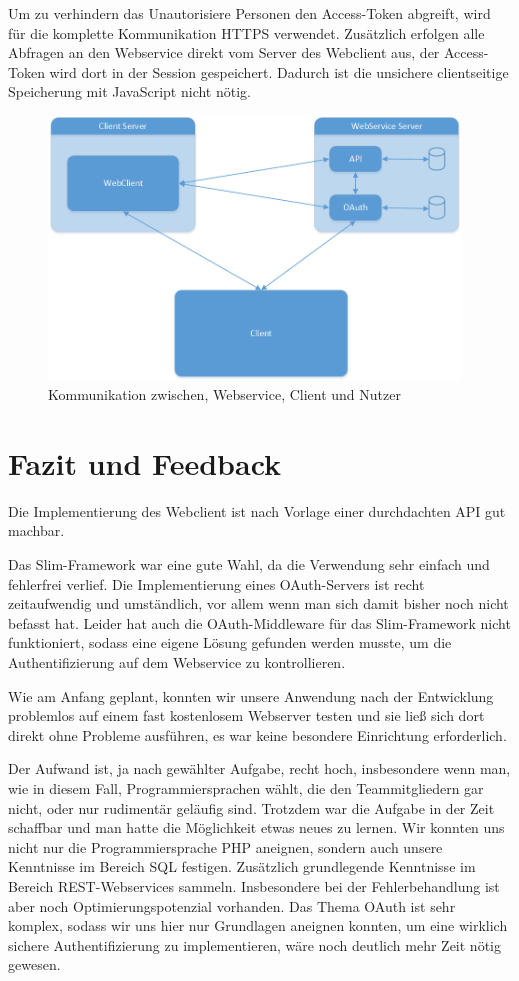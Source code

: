 Um zu verhindern das Unautorisiere Personen den Access-Token abgreift, wird für die komplette Kommunikation HTTPS verwendet. Zusätzlich erfolgen alle Abfragen an den Webservice direkt vom Server des Webclient aus, der Access-Token wird dort in der Session gespeichert. Dadurch ist die unsichere clientseitige Speicherung mit JavaScript nicht nötig.

\begin{figure}[h]
        \centering
	\includegraphics[height=70mm]{pics/Architektur.png}
	\caption{Kommunikation zwischen, Webservice, Client und Nutzer}
\end{figure}\label{oauth}

\chapter{Fazit und Feedback}

Die Implementierung des Webclient ist nach Vorlage einer durchdachten API gut machbar.

Das Slim-Framework war eine gute Wahl, da die Verwendung sehr einfach und fehlerfrei verlief. Die Implementierung eines OAuth-Servers ist recht zeitaufwendig und umständlich, vor allem wenn man sich damit bisher noch nicht befasst hat. Leider hat auch die OAuth-Middleware für das Slim-Framework nicht funktioniert, sodass eine eigene Lösung gefunden werden musste, um die Authentifizierung auf dem Webservice zu kontrollieren.

Wie am Anfang geplant, konnten wir unsere Anwendung nach der Entwicklung problemlos auf einem fast kostenlosem Webserver testen und sie ließ sich dort direkt ohne Probleme ausführen, es war keine besondere Einrichtung erforderlich. 

Der Aufwand ist, ja nach gewählter Aufgabe, recht hoch, insbesondere wenn man, wie in diesem Fall, Programmiersprachen wählt, die den Teammitgliedern gar nicht, oder nur rudimentär geläufig sind.
Trotzdem war die Aufgabe in der Zeit schaffbar und man hatte die Möglichkeit etwas neues zu lernen. 
Wir konnten uns nicht nur die Programmiersprache PHP aneignen, sondern auch unsere Kenntnisse im Bereich SQL festigen. 
Zusätzlich grundlegende Kenntnisse im Bereich REST-Webservices sammeln. 
Insbesondere bei der Fehlerbehandlung ist aber noch Optimierungspotenzial vorhanden. 
Das Thema OAuth ist sehr komplex, sodass wir uns hier nur Grundlagen aneignen konnten, um eine wirklich sichere Authentifizierung zu implementieren, wäre noch deutlich mehr Zeit nötig gewesen.

